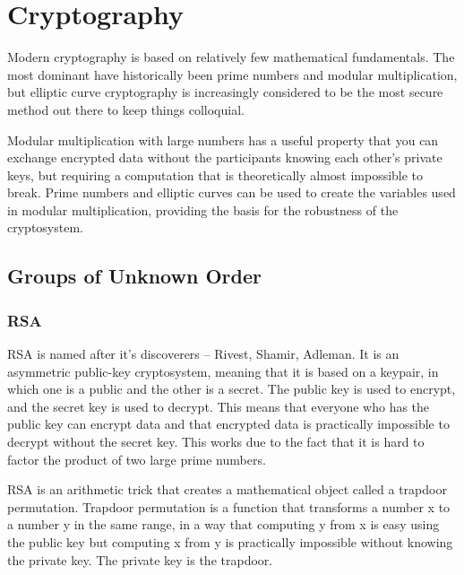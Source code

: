 \chapter{Cryptography}
\label{Cryptography}

Modern cryptography is based on relatively few mathematical fundamentals. The most dominant  have historically been prime numbers and modular multiplication, but elliptic curve cryptography is increasingly considered to be the most secure method out there to keep things colloquial.

Modular multiplication with large numbers has a useful property that you can exchange encrypted data without the participants knowing each other's private keys, but requiring a computation that is theoretically almost impossible to break. Prime numbers and elliptic curves can be used to create the variables used in modular multiplication, providing the basis for the robustness of the cryptosystem.

\section{Groups of Unknown Order}

\subsection{RSA}
RSA is named after it's discoverers – Rivest, Shamir, Adleman. It is an asymmetric public-key cryptosystem, meaning that it is based on a keypair, in which one is a public and the other is a secret. The public key is used to encrypt, and the secret key is used to decrypt. This means that everyone who has the public key can encrypt data and that encrypted data is practically impossible to decrypt without the secret key. This works due to the fact that it is hard to factor the product of two large prime numbers.

RSA is an arithmetic trick that creates a mathematical object called a trapdoor permutation. Trapdoor permutation is a function that transforms a number x to a number y in the same range, in a way that computing y from x is easy using the public key but computing x from y is practically impossible without knowing the private key. The private key is the trapdoor.\cite{Aumasson2018-nh}

